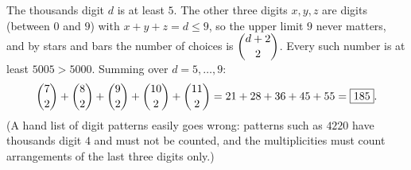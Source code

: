 The thousands digit $d$ is at least $5$. The other three digits $x,y,z$ are digits (between $0$ and $9$) with $x+y+z=d\le9$, so the upper limit $9$ never matters, and by stars and bars the number of choices is $\dbinom{d+2}{2}$. Every such number is at least $5005>5000$. Summing over $d=5,\dots,9$:
\[
\dbinom72+\dbinom82+\dbinom92+\dbinom{10}{2}+\dbinom{11}{2}=21+28+36+45+55=\boxed{185}.
\]
(A hand list of digit patterns easily goes wrong: patterns such as $4220$ have thousands digit $4$ and must not be counted, and the multiplicities must count arrangements of the last three digits only.)
